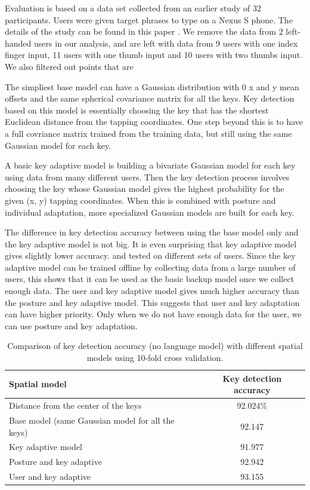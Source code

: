 \documentclass{sigchi}
\newcommand\tabhead[1]{\small\textbf{#1}}
\begin{document}
Evaluation is based on a data set collected from an earlier study of 32
participants. Users were given target phrases to type on a Nexus S phone. The
details of the study can be found in this paper \cite{}.
We remove the data from 2 left-handed users in our analysis, and are left with
data from 9 users with one index finger input, 11 users with one thumb input and
10 users with two thumbs input. We also filtered out points that are 

The simpliest base model can have a Gaussian distribution with 0 x and y
mean offsets and the same spherical covariance matrix for all the keys. Key
detection based on this model is essentially choosing the key that has the shortest Euclidean distance from the tapping coordinates. 
One step beyond this is to have a full covriance matrix trained from the
training data, but still using the same Gaussian model for each key.

A basic key adaptive model is building a bivariate Gaussian model for each key using data from many different users. Then the key detection process involves choosing the key whose Gaussian model gives the highest probability for the given (x, y) tapping coordinates. When this is combined with posture and individual adaptation, more specialized Gaussian models are built for each key.

The difference in key detection accuracy between using the base model only and
the key adaptive model is not big. It is even surprising that key adaptive model
gives slightly lower accuracy. and tested on different sets of users.
Since the key adaptive model can be trained offline by collecting data from a large number of users, this shows that it can be used as the basic backup model once we collect enough data. The user and key adaptive model gives much higher accuracy than the posture and key adaptive model. This suggests that user and key adaptation can have higher priority. Only when we do not have enough data for the user, we can use posture and key adaptation.

\begin{table} [tb]
  \centering
  \begin{tabular*}{0.5\textwidth}{ | l | c | }
    \hline
    \tabhead{Spatial model} & \tabhead{Key detection accuracy} \\
    \hline
    Distance from the center of the keys & 92.024\% \\
    \hline
    Base model (same Gaussian model for all the keys) & 92.147 \\
    \hline
    Key adaptive model  & 91.977 \\
    \hline
    Posture and key adaptive & 92.942 \\
    \hline
    User and key adaptive   & 93.155 \\
    \hline
  \end{tabular*}
  \caption{Comparison of key detection accuracy (no language model) with
  different spatial models using 10-fold cross validation.}
  \label{tab:comparison}
\end{table}
\end{document}
